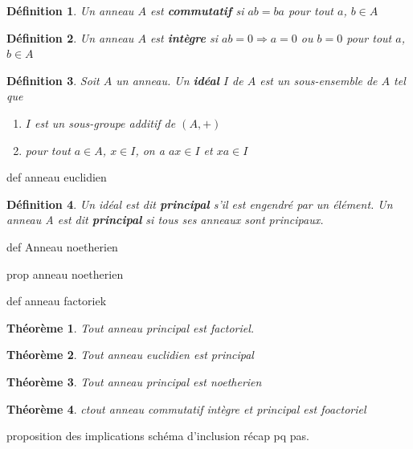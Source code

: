 \documentclass[a4paper,12pt]{report}  %
\theoremstyle{definitionstyle}
\newtheorem{definition}{Définition}[chapter] %
\theoremstyle{examplestyle}
\theoremstyle{remarkstyle}
\theoremstyle{propositionstyle}
\theoremstyle{theoremstyle}
\newtheorem{theoreme}{Théorème}[chapter]  %
\begin{document}
	\begin{definition}
		Un anneau $A$ est \textbf{commutatif} si $ab = ba$ pour tout $a$, $b \in A$
	\end{definition}
	
	\begin{definition}
		Un anneau $A$ est \textbf{intègre} si $ab=0 \Rightarrow a = 0$ ou $b = 0$ pour tout $a$, $b \in A$
	\end{definition}

	\begin{definition}
		Soit $A$ un anneau. Un \textbf{idéal} $I$ de $A$ est un sous-ensemble de $A$ tel que
		\begin{enumerate}
			\item $I$ est un sous-groupe additif de $(A, +)$
			\item pour tout $a \in A$, $x \in I$, on a $ax \in I$ et $xa \in I$
		\end{enumerate}
	\end{definition}

	def anneau euclidien
	
	\begin{definition}
		Un idéal est dit \textbf{principal} s'il est engendré par un élément. Un anneau A est dit \textbf{principal} si tous ses anneaux sont principaux.
	\end{definition} 
	
		

	def Anneau noetherien
	
	prop anneau noetherien
	
	
	def anneau factoriek
	
	\begin{theoreme}
		Tout anneau principal est factoriel.
	\end{theoreme}
	
	
	\begin{theoreme}
		Tout anneau euclidien est principal
	\end{theoreme}
	
	\begin{theoreme}
		Tout anneau principal est noetherien
	\end{theoreme}
	
	
	\begin{theoreme}
		ctout anneau commutatif intègre et principal est foactoriel
	\end{theoreme}
	
	
	

	
	
	proposition des implications
	schéma d'inclusion récap pq pas.
	
\end{document}
